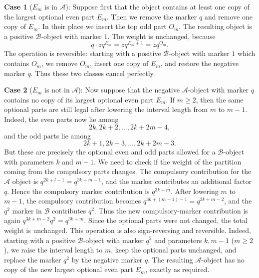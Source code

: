 \documentclass[10pt,a4paper]{amsart}
\numberwithin{equation}{section}
\begin{document}
\noindent \textbf{Case 1} ($E_m$ is in $\mathcal A$): Suppose first that the object contains at least one copy of the largest
optional even part $E_m$. Then we remove the marker \(q\) and remove one copy of \(E_m\).  In their place we insert the top odd part $O_m$. The resulting object is a positive \(\mathcal B\)-object with marker \(1\). The weight is unchanged, because
\[
q\cdot zq^{E_m}=zq^{E_m+1}=zq^{O_m}.
\]
The operation is reversible: starting with a positive \(\mathcal B\)-object with marker
\(1\) which contains \(O_m\), we remove \(O_m\), insert one copy of \(E_m\), and restore the negative marker \(q\).  Thus these two classes cancel
perfectly.

\noindent \textbf{Case 2} ($E_m$ is not in $\mathcal A$): Now suppose that the negative \(\mathcal A\)-object with marker \(q\) contains no copy
of its largest optional even part \(E_m\).  If \(m\ge2\), then the same
optional parts are still legal after lowering the interval length from \(m\)
to \(m-1\).  Indeed, the even parts now lie among
\[
2k,2k+2,\ldots,2k+2m-4,
\]
and the odd parts lie among
\[
2k+1,2k+3,\ldots,2k+2m-3.
\]
But these are precisely the optional even and odd parts allowed for a
\(\mathcal B\)-object with parameters \(k\) and \(m-1\). We need to check if the weight of the partition coming from the compulsory parts changes. The compulsory contribution for the $\mathcal A$ object is $q^{2k+l-1}=q^{3k+m-1}$, and the marker contributes an additional factor \(q\).  Hence the compulsory marker contribution is $q^{3k+m}$. After lowering \(m\) to \(m-1\), the compulsory contribution becomes $q^{3k+(m-1)-1}=q^{3k+m-2}$, and the $q^2$ marker in $\mathcal B$ contributes \(q^2\).  Thus the new compulsory-marker contribution is again $q^{3k+m-2}q^2=q^{3k+m}$. Since the optional parts were not changed, the total weight is unchanged. This operation is also sign-reversing and reversible. 
Indeed, starting with a positive \(\mathcal B\)-object
with marker \(q^2\) and parameters \(k, m-1\) ($m\ge 2$), we raise the interval length to
\(m\), keep the optional parts unchanged, and replace the marker \(q^2\) by
the negative marker \(q\).  The resulting \(\mathcal A\)-object has no copy of the new
largest optional even part \(E_m\), exactly as required.
\end{document}
